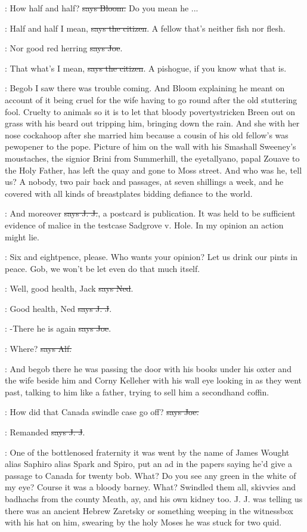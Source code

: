 \Bloom:
How half and half? \sout{says Bloom.}
Do you mean he ...

\citizen:
Half and half I mean, \sout{says the citizen}.
A fellow that's neither fish nor flesh.

\joe:
Nor good red herring \sout{says Joe}.

\citizen:
That what's I mean, \sout{says the citizen}.
A pishogue, if you know what that is.

\Nq:
Begob I saw there was trouble coming. And Bloom explaining he meant on
account of it being cruel for the wife having to go round after the
old stuttering fool. Cruelty to animals so it is to let that bloody
povertystricken Breen out on grass with his beard out tripping him,
bringing down the rain. And she with her nose cockahoop after she married
him because a cousin of his old fellow's was pewopener to the pope.
Picture of him on the wall with his Smashall Sweeney's moustaches, the
signior Brini from Summerhill, the eyetallyano, papal Zouave to the Holy
Father, has left the quay and gone to Moss street. And who was he, tell
us? A nobody, two pair back and passages, at seven shillings a week, and
he covered with all kinds of breastplates bidding defiance to the world.

\jjom:
And moreover \sout{says J. J.},
a postcard is publication. It was held to be
sufficient evidence of malice in the testcase Sadgrove v. Hole. In my
opinion an action might lie.

\Nq:
Six and eightpence, please. Who wants your opinion? Let us drink
our pints in peace. Gob, we won't be let even do that much itself.

\lambert:
Well, good health, Jack \sout{says Ned}.

\jjom:
Good health, Ned \sout{says J. J}.

\joe:
-There he is again \sout{says Joe}.

\bergan:
Where? \sout{says Alf.}

\Nq:
And begob there he was passing the door with his books under his
oxter and the wife beside him and Corny Kelleher with his wall eye looking
in as they went past, talking to him like a father, trying to sell him a
secondhand coffin.

\joe:
How did that Canada swindle case go off? \sout{says Joe.}

\jjom:
Remanded \sout{says J. J}.

\Nq:
One of the bottlenosed fraternity it was went by the name of James
Wought alias Saphiro alias Spark and Spiro, put an ad in the papers saying
he'd give a passage to Canada for twenty bob. What? Do you see any green
in the white of my eye? Course it was a bloody barney. What? Swindled
them all, skivvies and badhachs from the county Meath, ay, and his own
kidney too. J. J. was telling us there was an ancient Hebrew Zaretsky or
something weeping in the witnessbox with his hat on him, swearing by the
holy Moses he was stuck for two quid.

